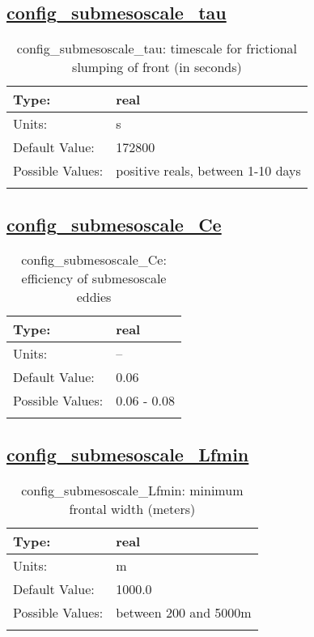 \subsection[config\_submesoscale\_tau]{\hyperref[sec:nm_tab_submesoscale_eddy_parameterization]{config\_submesoscale\_tau}}
\label{subsec:nm_sec_config_submesoscale_tau}
\begin{center}
\begin{longtable}{| p{2.0in} || p{4.0in} |}
    \hline
    Type: & real \\
    \hline
    Units: & \si{s} \\
    \hline
    Default Value: & 172800 \\
    \hline
    Possible Values: & positive reals, between 1-10 days \\
    \hline
    \caption{config\_submesoscale\_tau: timescale for frictional slumping of front (in seconds)}
\end{longtable}
\end{center}
\subsection[config\_submesoscale\_Ce]{\hyperref[sec:nm_tab_submesoscale_eddy_parameterization]{config\_submesoscale\_Ce}}
\label{subsec:nm_sec_config_submesoscale_Ce}
\begin{center}
\begin{longtable}{| p{2.0in} || p{4.0in} |}
    \hline
    Type: & real \\
    \hline
    Units: & -- \\
    \hline
    Default Value: & 0.06 \\
    \hline
    Possible Values: & 0.06 - 0.08 \\
    \hline
    \caption{config\_submesoscale\_Ce: efficiency of submesoscale eddies}
\end{longtable}
\end{center}
\subsection[config\_submesoscale\_Lfmin]{\hyperref[sec:nm_tab_submesoscale_eddy_parameterization]{config\_submesoscale\_Lfmin}}
\label{subsec:nm_sec_config_submesoscale_Lfmin}
\begin{center}
\begin{longtable}{| p{2.0in} || p{4.0in} |}
    \hline
    Type: & real \\
    \hline
    Units: & \si{m} \\
    \hline
    Default Value: & 1000.0 \\
    \hline
    Possible Values: & between 200 and 5000m \\
    \hline
    \caption{config\_submesoscale\_Lfmin: minimum frontal width (meters)}
\end{longtable}
\end{center}
